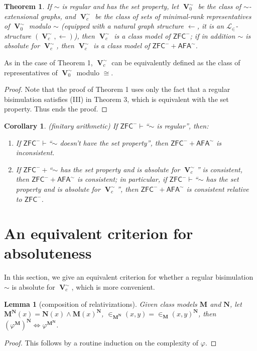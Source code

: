 \documentclass{amsart}
\newcommand{\zfc}{\mathsf{ZFC}}
\newcommand{\afa}{\mathsf{AFA}}
\DeclareMathOperator{\uni}{\mathbf{V}}
\newtheorem{theorem}{Theorem}
\newtheorem{lemma}{Lemma}
\newtheorem{corollary}{Corollary}
\begin{document}
\begin{theorem}
    If $\sim$ is regular and has the set property, let $\uni_0^\sim$ be the class of $\sim$-extensional graphs, and $\uni_c^\sim$ be the class of sets of minimal-rank representatives of $\uni_0^\sim$ modulo $\sim$ (equipped with a natural graph structure $\leftarrow$, it is an $\mathcal{L}_\in$-structure $(\uni_c^\sim,\leftarrow)$), then $\uni_c^\sim$ is a class model of $\zfc^-$; if in addition $\sim$ is absolute for $\uni_c^\sim$, then $\uni_c^\sim$ is a class model of $\zfc^-+\afa^\sim$.
\end{theorem}

As in the case of Theorem 1, $\uni_c^\sim$ can be equivalently defined as the class of representatives of $\uni_0^\sim$ modulo $\cong$.

\begin{proof}
    Note that the proof of Theorem 1 uses only the fact that a regular bisimulation satisfies (III) in Theorem 3, which is equivalent with the set property. Thus ends the proof.
\end{proof}

\begin{corollary}
    (finitary arithmetic) If $\zfc^-\vdash$``$\sim$ is regular'', then:
    \begin{enumerate}[label=(\arabic*)]
        \item If $\zfc^-\vdash$``$\sim$ doesn't have the set property'', then $\zfc^-+\afa^\sim$ is inconsistent.
        \item If $\zfc^-+$``$\sim$ has the set property and is absolute for $\uni_c^\sim$'' is consistent, then $\zfc^-+\afa^\sim$ is consistent; in particular, if $\zfc^-\vdash$``$\sim$ has the set property and is absolute for $\uni_c^\sim$'', then $\zfc^-+\afa^\sim$ is consistent relative to $\zfc^-$.
    \end{enumerate}
\end{corollary}

\iffalse

\section{An equivalent criterion for absoluteness}

In this section, we give an equivalent criterion for whether a regular bisimulation $\sim$ is absolute for $\uni_c^\sim$, which is more convenient.

\begin{lemma}[composition of relativizations]
    Given class models $\mathbf{M}$ and $\mathbf{N}$, let $\mathbf{M}^\mathbf{N}(x)=\mathbf{N}(x)\land \mathbf{M}(x)^\mathbf{N}$, $\in_{\mathbf{M}^\mathbf{N}}(x,y)=\in_\mathbf{M}(x,y)^\mathbf{N}$, then $(\varphi^\mathbf{M})^\mathbf{N}\Leftrightarrow \varphi^{\mathbf{M}^\mathbf{N}}$.
\end{lemma}
\begin{proof}
    This follows by a routine induction on the complexity of $\varphi$.
\end{proof}
\end{document}
